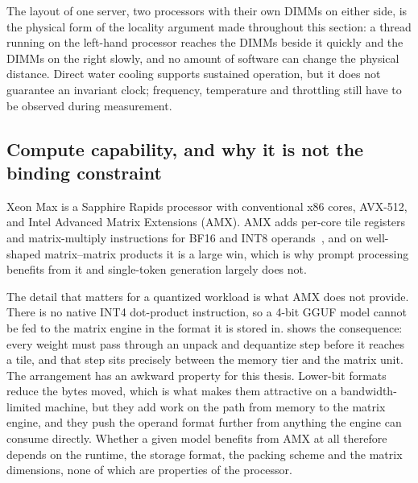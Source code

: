 The layout of one server, two processors with their own DIMMs on either side, is
the physical form of the locality argument made throughout this section:
a thread running on the left-hand processor reaches the DIMMs beside it
quickly and the DIMMs on the right slowly, and no amount of software can
change the physical distance.  Direct water cooling supports sustained
operation, but it does not guarantee an invariant clock; frequency,
temperature and throttling still have to be observed during measurement.

\subsection{Compute capability, and why it is not the binding constraint}

Xeon Max is a Sapphire Rapids processor with conventional x86 cores,
AVX-512, and Intel Advanced Matrix Extensions (AMX).  AMX adds per-core
tile registers and matrix-multiply instructions for BF16 and INT8
operands~\cite{intelmax,na2024llmcpu}, and on well-shaped
matrix--matrix products it is a large win, which is why prompt
processing benefits from it and single-token generation largely does
not.

The detail that matters for a quantized workload is what AMX does not
provide.  There is no native INT4 dot-product instruction, so a 4-bit
GGUF model cannot be fed to the matrix engine in the format it is stored
in.   shows the consequence: every weight must
pass through an unpack and dequantize step before it reaches a tile, and
that step sits precisely between the memory tier and the matrix unit.
The arrangement has an awkward property for this thesis.  Lower-bit
formats reduce the bytes moved, which is what makes them attractive on a
bandwidth-limited machine, but they add work on the path from memory to
the matrix engine, and they push the operand format further from
anything the engine can consume directly.  Whether a given model
benefits from AMX at all therefore depends on the runtime, the storage
format, the packing scheme and the matrix dimensions, none of which are
properties of the processor.

